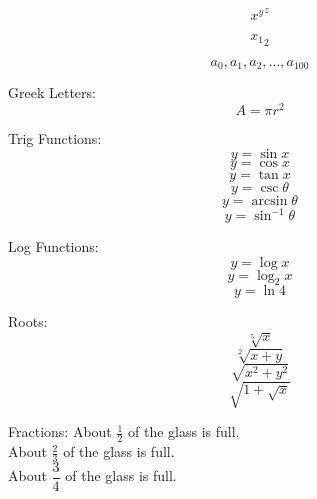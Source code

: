 \documentclass[12pt]{article}
\begin{document}
$$ {x^y}^z $$

$$ {x_1}_2 $$

$$ a_0, a_1, a_2, \ldots, a_{100} $$

Greek Letters:
$$ A = \pi r^2 $$

Trig Functions:
$$ y = \sin x $$
$$ y = \cos x $$
$$ y = \tan x $$
$$ y = \csc \theta $$
$$ y = \arcsin \theta $$
$$ y = \sin^{-1} \theta $$

Log Functions:
$$ y = \log x $$
$$ y = \log_2 x $$
$$ y = \ln 4 $$

Roots:
$$ \sqrt[5]{x} $$
$$ \sqrt[2]{x+y} $$
$$ \sqrt{x^2 + y^2} $$
$$ \sqrt{1 + \sqrt{x}} $$

Fractions:
About $ \frac{1}{2} $ of the glass is full.\\[3pt]
About $ \displaystyle \frac{2}{3} $ of the glass is full.\\[3pt]
About $ \dfrac{3}{4} $ of the glass is full.
\end{document}
